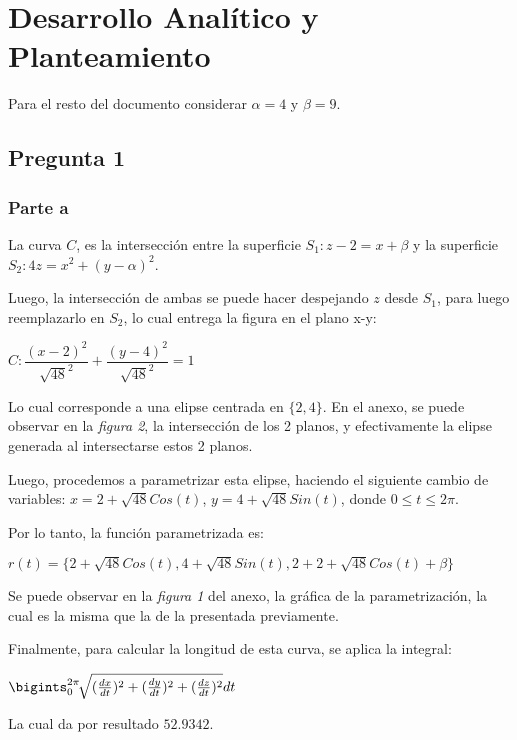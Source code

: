 \documentclass[12pt,letterpaper]{article}
\begin{document}


\section{Desarrollo Analítico y Planteamiento}
Para el resto del documento considerar $\alpha=4$ y $\beta=9$.
\subsection{Pregunta 1}
\subsubsection{Parte a}
La curva $C$, es la intersección entre la superficie $S_1: z-2=x+\beta$ y la superficie $S_2: 4z=x^2+ (y- \alpha)^2$.

Luego, la intersección de ambas se puede hacer despejando $z$ desde $S_1$, para luego reemplazarlo en $S_2$, lo cual entrega la figura en el plano x-y:

\begin{center}$C: \dfrac{(x-2)^2}{\sqrt{48}^2} + \dfrac{(y-4)^2}{\sqrt{48}^2}=1$\end{center}

Lo cual corresponde a una elipse centrada en $\{2,4\}$. En el anexo, se puede observar en la \textit{figura 2}, la intersección de los 2 planos, y efectivamente la elipse generada al intersectarse estos 2 planos.

Luego, procedemos a parametrizar esta elipse, haciendo el siguiente cambio de variables: $x=2+\sqrt{48}Cos(t)$, $y=4+\sqrt{48}Sin(t)$, donde $0\leq t \leq 2\pi$.

Por lo tanto, la función parametrizada es:

\begin{center}$r(t)=\{2+\sqrt{48}Cos(t),4+\sqrt{48}Sin(t),2+2+\sqrt{48}Cos(t)+\beta \}$\end{center}

Se puede observar en la \textit{figura 1} del anexo, la gráfica de la parametrización, la cual es la misma que la de la presentada previamente.

Finalmente, para calcular la longitud de esta curva, se aplica la integral:

\begin{center}$\bigints_0^{2\pi} \! \sqrt{(\frac{dx}{dt})^2+(\frac{dy}{dt})^2+(\frac{dz}{dt})^2} dt$\end{center}

La cual da por resultado $52.9342$.
\end{document}
